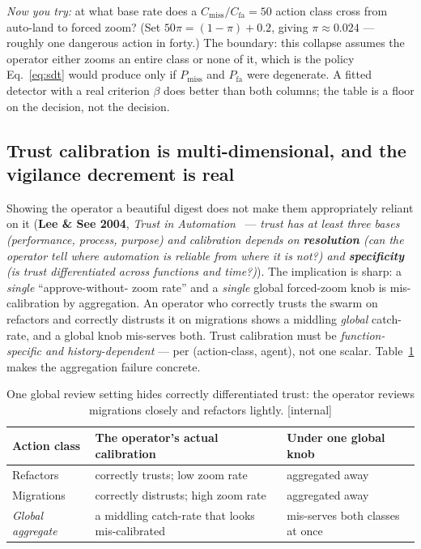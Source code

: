 \documentclass[11pt,a4paper]{article}
\theoremstyle{definition}
\theoremstyle{plain}
\begin{document}
\emph{Now you try:} at what base rate does a $C_{\text{miss}}/C_{\text{fa}}=50$
action class cross from auto-land to forced zoom? (Set $50\pi = (1-\pi)+0.2$, giving
$\pi \approx 0.024$ --- roughly one dangerous action in forty.) The boundary:
this collapse assumes the operator either zooms an entire class or none of it, which
is the policy Eq.~\ref{eq:sdt} would produce only if $P_{\text{miss}}$ and
$P_{\text{fa}}$ were degenerate. A fitted detector with a real criterion $\beta$ does
better than both columns; the table is a floor on the decision, not the decision.

\subsection{Trust calibration is multi-dimensional, and the vigilance decrement is real}\label{sec:calibration}

Showing the operator a beautiful digest does not make them appropriately reliant on
it (\textbf{Lee \& See 2004}, \emph{Trust in Automation}~ ---
\emph{trust has at least three bases (performance, process, purpose) and calibration
depends on \textbf{resolution} (can the operator tell where automation is reliable
from where it is not?) and \textbf{specificity} (is trust differentiated across
functions and time?)}). The implication is sharp: a \emph{single} ``approve-without-
zoom rate'' and a \emph{single} global forced-zoom knob is mis-calibration by
aggregation. An operator who correctly trusts the swarm on refactors and correctly
distrusts it on migrations shows a middling \emph{global} catch-rate, and a global
knob mis-serves both. Trust calibration must be \emph{function-specific and
history-dependent} --- per (action-class, agent), not one scalar. Table~\ref{tab:trust-calibration} makes the aggregation failure concrete.

\begin{table}[H]
\centering
\small
\renewcommand{\arraystretch}{1.25}
\setlength{\tabcolsep}{4pt}
\begin{tabularx}{\textwidth}{@{}>{\raggedright\arraybackslash}p{} >{\raggedright\arraybackslash}X >{\raggedright\arraybackslash}X@{}}
\toprule
\textbf{Action class} & \textbf{The operator's actual calibration} & \textbf{Under one global knob} \\
\midrule
Refactors & correctly trusts; low zoom rate & aggregated away \\
Migrations & correctly distrusts; high zoom rate & aggregated away \\
\emph{Global aggregate} & a middling catch-rate that looks mis-calibrated & mis-serves both classes at once \\
\bottomrule
\end{tabularx}
\caption{One global review setting hides correctly differentiated trust:
the operator reviews migrations closely and refactors lightly. [internal]}
\label{tab:trust-calibration}
\end{table}
\end{document}
